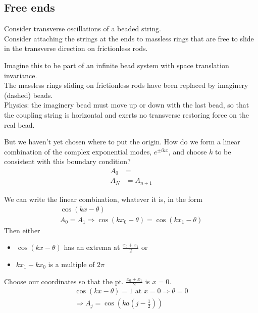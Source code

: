 \documentclass[twoside, 10pt]{amsart}
\begin{document}
\subsection{Free ends}
Consider transverse oscillations of a beaded string.  \\
Consider attaching the strings at the ends to massless rings that are free to slide in the transverse direction on frictionless rods.  

Imagine this to be part of an infinite bead system with space translation invariance.  \\
The massless rings sliding on frictionless rods have been replaced by imaginery (dashed) beads.  \\
\quad Physics: the imaginery bead must move up or down with the last bead, so that the coupling string is horizontal and exerts no transverse restoring force on the real bead.  

But we haven't yet chosen where to put the origin.  How do we form a linear combination of the complex exponential modes, $e^{\pm ikx}$, and choose $k$ to be consistent with this boundary condition?  
\[
\begin{aligned}
A_0 & = \\
A_N & = A_{n+1} 
\end{aligned}
\]

We can write the linear combination, whatever it is, in the form
\[
\begin{gathered}
\cos{ (kx - \theta)}  \\
  A_0 = A_1 \Longrightarrow \cos{ (kx_0 - \theta)} = \cos{ ( kx_1 - \theta )}   
\end{gathered}
\]
Then either 
\begin{itemize}
\item $\cos{ (kx - \theta)}$ has an extrema at $\frac{ x_0 + x_1}{2} $ or 
\item $kx_1 -kx_0$ is a multiple of $2\pi$ 
\end{itemize}

Choose our coordinates so that the pt. $\frac{ x_0 + x_1}{2} $ is $x=0$.  
\[
\begin{gathered}
\cos{ (kx - \theta)} = 1 \text{ at } x = 0 \Longrightarrow \theta = 0 \\
\Longrightarrow A_j = \cos{ ( ka(j-\frac{1}{2} ) ) }
\end{gathered}
\]
\end{document}

